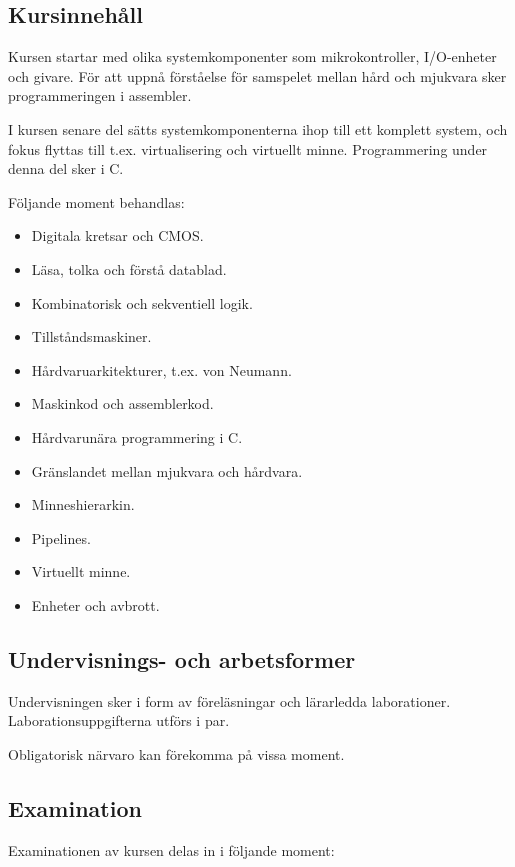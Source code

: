 \subsection*{Kursinnehåll}

Kursen startar med olika systemkomponenter som mikrokontroller,
I/O-enheter och givare. För att uppnå förståelse för samspelet mellan
hård och mjukvara sker programmeringen i assembler.

I kursen senare del sätts systemkomponenterna ihop till ett komplett
system, och fokus flyttas till t.ex. virtualisering och virtuellt minne.
Programmering under denna del sker i C.

Följande moment behandlas:

\begin{itemize}
\tightlist
\item
  Digitala kretsar och CMOS.
\item
  Läsa, tolka och förstå datablad.
\item
  Kombinatorisk och sekventiell logik.
\item
  Tillståndsmaskiner.
\item
  Hårdvaruarkitekturer, t.ex. von Neumann.
\item
  Maskinkod och assemblerkod.
\item
  Hårdvarunära programmering i C.
\item
  Gränslandet mellan mjukvara och hårdvara.
\item
  Minneshierarkin.
\item
  Pipelines.
\item
  Virtuellt minne.
\item
  Enheter och avbrott.
\end{itemize}

\subsection*{Undervisnings- och
arbetsformer}

Undervisningen sker i form av föreläsningar och lärarledda laborationer.
Laborationsuppgifterna utförs i par.

Obligatorisk närvaro kan förekomma på vissa moment.

\subsection*{Examination}

Examinationen av kursen delas in i följande moment:

